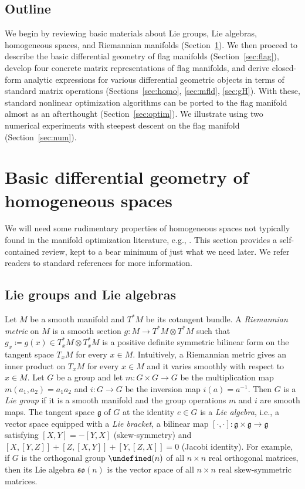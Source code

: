 \documentclass[11pt,reqno]{amsart}%
\theoremstyle{definition}
\theoremstyle{remark}
\let\O\undefined
\DeclareMathOperator{\O}{O}
\begin{document}
\subsection{Outline} We begin by reviewing basic materials about Lie groups, Lie algebras, homogeneous spaces, and Riemannian manifolds (Section~\ref{sec:basic}). We then proceed to describe the basic differential geometry of flag manifolds (Section~\ref{sec:flag}), develop four concrete matrix representations of flag manifolds, and derive closed-form analytic expressions for various differential geometric objects in terms of standard matrix operations (Sections~\ref{sec:homo}, \ref{sec:mfld}, \ref{sec:gH}). With these, standard nonlinear optimization algorithms can be ported to the flag manifold almost as an afterthought (Section~\ref{sec:optim}). We illustrate using two numerical experiments with steepest descent on the flag manifold (Section~\ref{sec:num}).

\section{Basic differential geometry of homogeneous spaces}\label{sec:basic}

We will need some rudimentary properties of homogeneous spaces not typically found in the manifold optimization literature, e.g., \cite{AMS2009,EAS}.  This section provides a self-contained review, kept to a bear minimum of just what we need later. We refer readers to standard references \cite{Helgason1978,KN1969,Boothby1975} for more information.

\subsection{Lie groups and Lie algebras}\label{sec:Lie}
Let $M$ be a smooth manifold and $T^\ast M$ be its cotangent bundle. A \emph{Riemannian metric} on $M$ is a smooth section $g: M \to T^\ast M \otimes T^\ast M$ such that $g_x \coloneqq g(x) \in T^\ast_xM \otimes T^\ast_x M$ is a positive definite symmetric bilinear form on the tangent space $T_xM$ for every $x\in M$. Intuitively, a Riemannian metric gives an inner product on $T_xM$ for every $x\in M$ and it varies smoothly with respect to $x\in M$. Let $G$ be a group and let $m:G\times G \to G$ be the multiplication map $m(a_1,a_2) = a_1a_2$ and $i: G \to G$ be the inversion map $i(a) = a^{-1}$. Then $G$ is a \emph{Lie group} if it is a smooth manifold and the group operations $m$ and $i$ are smooth maps. The tangent space $\mathfrak{g}$ of $G$ at the identity $e\in G$ is a \emph{Lie algebra}, i.e., a vector space equipped with a \emph{Lie bracket}, a bilinear map  $[\cdot, \cdot]: \mathfrak{g} \times \mathfrak{g} \to \mathfrak{g}$ satisfying $[X,Y] = -[Y,X]$ (skew-symmetry) and $[X,[Y,Z]] + [Z,[X,Y]] + [Y,[Z,X]] = 0$ (Jacobi identity). For example, if $G$ is the orthogonal group $\O(n)$ of all $n\times n$ real orthogonal matrices, then its Lie algebra  $\mathfrak{so}(n)$ is the vector space of all $n\times n$ real skew-symmetric matrices. 
\end{document}
